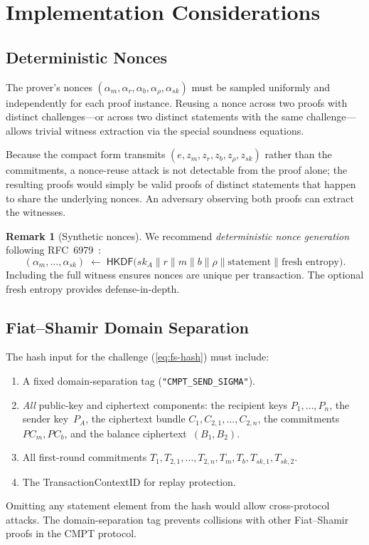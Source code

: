 \documentclass[11pt]{article}
\theoremstyle{definition}
\newtheorem{remark}[theorem]{Remark}
\newcommand{\sk}{\mathit{sk}}
\newcommand{\TransCtx}{\textsf{TransactionContextID}}
\begin{document}
\section{Implementation Considerations}
\label{sec:implementation}

\subsection{Deterministic Nonces}
\label{sec:nonces}

The prover's nonces
$(\alpha_m, \alpha_r, \alpha_b, \alpha_\rho, \alpha_{\sk})$ must be
sampled uniformly and independently for each proof instance.
Reusing a nonce across two proofs with distinct
challenges---or across two distinct statements with the same
challenge---allows trivial witness extraction via the special
soundness equations.

Because the compact form transmits $(e, z_m, z_r, z_b, z_\rho, z_{\sk})$
rather than the commitments, a nonce-reuse attack is not detectable
from the proof alone; the resulting proofs would simply be valid proofs
of distinct statements that happen to share the underlying nonces.
An adversary observing both proofs can extract the witnesses.

\begin{remark}[Synthetic nonces]
  \label{rem:synthetic-nonces}
  We recommend \emph{deterministic nonce generation} following
  RFC~6979~\cite{RFC6979}:
  \[
    (\alpha_m, \ldots, \alpha_{\sk}) \;\leftarrow\;
    \mathsf{HKDF}\bigl(
    \sk_A \| r \| m \| b \| \rho \| \text{statement}
    \| \text{fresh entropy}
    \bigr).
  \]
  Including the full witness ensures nonces are unique per transaction.
  The optional fresh entropy provides defense-in-depth.
\end{remark}

\subsection{Fiat--Shamir Domain Separation}
\label{sec:domain-sep}

The hash input for the challenge (\cref{eq:fs-hash}) must include:
\begin{enumerate}
  \item A fixed domain-separation tag
        (\texttt{"CMPT\_SEND\_SIGMA"}).
  \item \emph{All} public-key and ciphertext components:
        the recipient keys $P_1, \ldots, P_n$, the sender key~$P_A$,
        the ciphertext bundle $C_1, C_{2,1}, \ldots, C_{2,n}$, the
        commitments $\mathit{PC}_m, \mathit{PC}_b$, and the balance
        ciphertext~$(B_1, B_2)$.
  \item All first-round commitments
        $T_1, T_{2,1}, \ldots, T_{2,n}, T_m, T_b, T_{\sk,1}, T_{\sk,2}$.
  \item The \TransCtx{} for replay protection.
\end{enumerate}
Omitting any statement element from the hash would allow
cross-protocol attacks.
The domain-separation tag prevents collisions with other
Fiat--Shamir proofs in the CMPT protocol.
\end{document}
